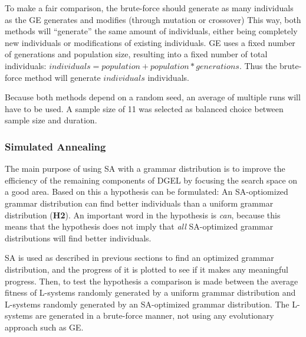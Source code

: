 To make a fair comparison, the brute-force should generate as many individuals as the GE generates and modifies (through mutation or crossover)
This way, both methods will ``generate'' the same amount of individuals, either being completely new individuals or modifications of existing individuals.
GE uses a fixed number of generations and population size, resulting into a fixed number of total individuals: $individuals = population + population * generations$.
Thus the brute-force method will generate $individuals$ individuals.

Because both methods depend on a random seed, an average of multiple runs will have to be used.
A sample size of 11 was selected as balanced choice between sample size and duration.

\subsubsection{Simulated Annealing}
The main purpose of using SA with a grammar distribution is to improve the efficiency of the remaining components of DGEL by focusing the search space on a good area.
Based on this a hypothesis can be formulated: An SA-optiomized grammar distribution can find better individuals than a uniform grammar distribution (\textbf{H2}).
An important word in the hypothesis is \textit{can}, because this means that the hypothesis does not imply that \textit{all} SA-optimized grammar distributions will find better individuals.

SA is used as described in previous sections to find an optimized grammar distribution, and the progress of it is plotted to see if it makes any meaningful progress.
Then, to test the hypothesis a comparison is made between the average fitness of L-systems randomly generated by a uniform grammar distribution and L-systems randomly generated by an SA-optimized grammar distribution.
The L-systems are generated in a brute-force manner, not using any evolutionary approach such as GE.

